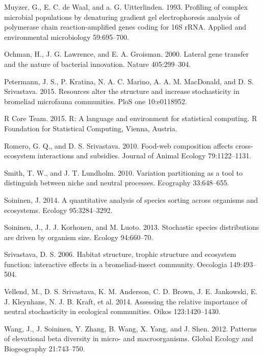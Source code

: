 \documentclass[12pt,]{article}
\begin{document}
\hypertarget{ref-Muyzer1993}{}
Muyzer, G., E. C. de Waal, and a. G. Uitterlinden. 1993. Profiling of
complex microbial populations by denaturing gradient gel electrophoresis
analysis of polymerase chain reaction-amplified genes coding for 16S
rRNA. Applied and environmental microbiology 59:695--700.

\hypertarget{ref-Ochman2000-is}{}
Ochman, H., J. G. Lawrence, and E. A. Groisman. 2000. Lateral gene
transfer and the nature of bacterial innovation. Nature 405:299--304.

\hypertarget{ref-Petermann2015}{}
Petermann, J. S., P. Kratina, N. A. C. Marino, A. A. M. MacDonald, and
D. S. Srivastava. 2015. Resources alter the structure and increase
stochasticity in bromeliad microfauna communities. PloS one 10:e0118952.

\hypertarget{ref-rcore}{}
R Core Team. 2015. R: A language and environment for statistical
computing. R Foundation for Statistical Computing, Vienna, Austria.

\hypertarget{ref-Romero2010}{}
Romero, G. Q., and D. S. Srivastava. 2010. Food-web composition affects
cross-ecosystem interactions and subsidies. Journal of Animal Ecology
79:1122--1131.

\hypertarget{ref-Smith2010}{}
Smith, T. W., and J. T. Lundholm. 2010. Variation partitioning as a tool
to distinguish between niche and neutral processes. Ecography
33:648--655.

\hypertarget{ref-Soininen2014}{}
Soininen, J. 2014. A quantitative analysis of species sorting across
organisms and ecosystems. Ecology 95:3284--3292.

\hypertarget{ref-Soininen2013}{}
Soininen, J., J. J. Korhonen, and M. Luoto. 2013. Stochastic species
distributions are driven by organism size. Ecology 94:660--70.

\hypertarget{ref-Srivastava2006a}{}
Srivastava, D. S. 2006. Habitat structure, trophic structure and
ecosystem function: interactive effects in a bromeliad-insect community.
Oecologia 149:493--504.

\hypertarget{ref-Vellend2014}{}
Vellend, M., D. S. Srivastava, K. M. Anderson, C. D. Brown, J. E.
Jankowski, E. J. Kleynhans, N. J. B. Kraft, et al. 2014. Assessing the
relative importance of neutral stochasticity in ecological communities.
Oikos 123:1420--1430.

\hypertarget{ref-Wang2012b}{}
Wang, J., J. Soininen, Y. Zhang, B. Wang, X. Yang, and J. Shen. 2012.
Patterns of elevational beta diversity in micro- and macroorganisms.
Global Ecology and Biogeography 21:743--750.
\end{document}
